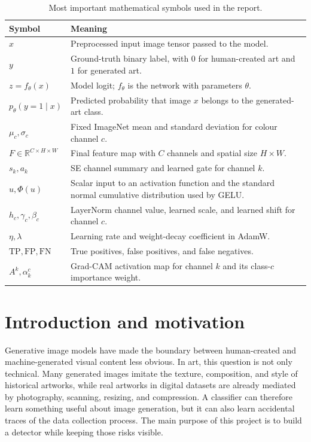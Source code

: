 \documentclass[11pt,a4paper]{article}
\begin{document}
\begin{table}[H]
\centering
\small
\begin{tabular}{@{}p{}p{}@{}}
\toprule
Symbol & Meaning \\
\midrule
\(x\) & Preprocessed input image tensor passed to the model. \\
\(y\) & Ground-truth binary label, with \(0\) for human-created art and \(1\) for generated art. \\
\(z=f_\theta(x)\) & Model logit; \(f_\theta\) is the network with parameters \(\theta\). \\
\(p_\theta(y=1\mid x)\) & Predicted probability that image \(x\) belongs to the generated-art class. \\
\(\mu_c,\sigma_c\) & Fixed ImageNet mean and standard deviation for colour channel \(c\). \\
\(F\in\mathbb{R}^{C\times H\times W}\) & Final feature map with \(C\) channels and spatial size \(H\times W\). \\
\(s_k,a_k\) & SE channel summary and learned gate for channel \(k\). \\
\(u,\Phi(u)\) & Scalar input to an activation function and the standard normal cumulative distribution used by GELU. \\
\(h_c,\gamma_c,\beta_c\) & LayerNorm channel value, learned scale, and learned shift for channel \(c\). \\
\(\eta,\lambda\) & Learning rate and weight-decay coefficient in AdamW. \\
\(\mathrm{TP},\mathrm{FP},\mathrm{FN}\) & True positives, false positives, and false negatives. \\
\(A^k,\alpha_k^c\) & Grad-CAM activation map for channel \(k\) and its class-\(c\) importance weight. \\
\bottomrule
\end{tabular}
\caption{Most important mathematical symbols used in the report.}
\label{tab:notation}
\end{table}

\section{Introduction and motivation}

Generative image models have made the boundary between human-created and
machine-generated visual content less obvious. In art, this question is not
only technical. Many generated images imitate the texture, composition, and
style of historical artworks, while real artworks in digital datasets are
already mediated by photography, scanning, resizing, and compression. A
classifier can therefore learn something useful about image generation, but it
can also learn accidental traces of the data collection process. The main
purpose of this project is to build a detector while keeping those risks
visible.
\end{document}
